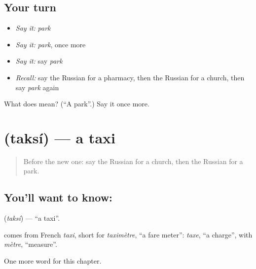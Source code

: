 \subsection*{Your turn}
\begin{itemize}
\raggedright
  \item \emph{Say it:} \emph{park}
  \item \emph{Say it:} \emph{park}, once more
  \item \emph{Say it:} say \emph{park}
  \item \emph{Recall:} say the Russian for a pharmacy, then the Russian for a church, then say \emph{park} again
\end{itemize}

\begin{tcolorbox}[breakable,colback=teal!4,colframe=teal!35!black,title={Before you move on}]
What does  mean? (\textquotedblleft{}A park\textquotedblright{}.) Say it once more.
\end{tcolorbox}
\section[\texorpdfstring{\ru{такси} (taksí)}{такси (taksí)}]{ (taksí) — a taxi}

\label{lesson:RU-C80-taxi}



\begin{quote}
Before the new one: say the Russian for a church, then the Russian for a park.
\end{quote}

\subsection*{You'll want to know: }
\textbf{} (\emph{taksí}) — \textquotedblleft{}a taxi\textquotedblright{}.

\begin{cousinweb}
\textbf{} comes from French \emph{taxi}, short for \emph{taximètre}, \textquotedblleft{}a fare meter\textquotedblright{}: \emph{taxe}, \textquotedblleft{}a charge\textquotedblright{}, with \emph{mètre}, \textquotedblleft{}measure\textquotedblright{}.
\end{cousinweb}

\begin{grammarlens}[title={What you've built}]
One more word for this chapter.
\end{grammarlens}

